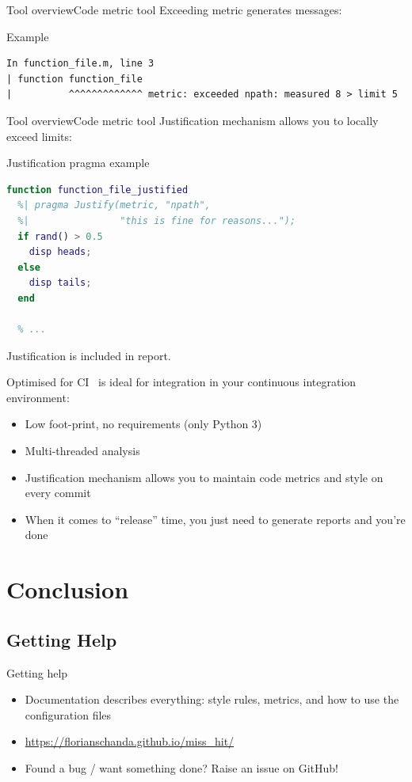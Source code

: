 \documentclass{beamer}
\newcommand{\mh}[0]{{\sc\structure{Miss\_Hit}}}
\begin{document}
\begin{frame}[fragile]{Tool overview}{Code metric tool}
  Exceeding metric generates messages:
  \begin{block}{Example}
    \scriptsize
\begin{verbatim}
In function_file.m, line 3
| function function_file
|          ^^^^^^^^^^^^^ metric: exceeded npath: measured 8 > limit 5
\end{verbatim}
  \end{block}
\end{frame}

\begin{frame}[fragile]{Tool overview}{Code metric tool}
  Justification mechanism allows you to locally exceed limits:
  \begin{block}{Justification pragma example}
\begin{lstlisting}[language=MATLAB]
function function_file_justified
  %| pragma Justify(metric, "npath",
  %|                "this is fine for reasons...");
  if rand() > 0.5
    disp heads;
  else
    disp tails;
  end

  % ...
\end{lstlisting}
  \end{block}
  \pause
  Justification is included in report.
\end{frame}

\begin{frame}{Optimised for CI}
  \mh~is ideal for integration in your continuous integration
  environment:
  \begin{itemize}
  \item Low foot-print, no requirements (only Python 3)
  \item Multi-threaded analysis
  \item Justification mechanism allows you to maintain code metrics
    and style on every commit
  \item When it comes to ``release'' time, you just need to generate
    reports and you're done
  \end{itemize}
\end{frame}

\section{Conclusion}
\subsection{Getting Help}
\begin{frame}{Getting help}
  \begin{itemize}
  \item Documentation describes everything: style rules, metrics, and
    how to use the configuration files
  \item \url{https://florianschanda.github.io/miss_hit/}
    \pause
  \item Found a bug / want something done? Raise an issue on GitHub!
  \end{itemize}
\end{frame}
\end{document}
